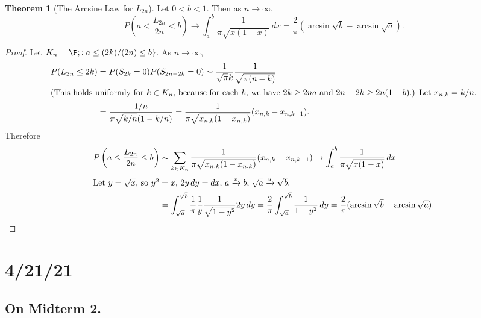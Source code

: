 \documentclass{article}
\theoremstyle{definition}
\newtheorem{theorem}{Theorem}
\begin{document}
\begin{theorem}[The Arcsine Law for $L_{2n}$]
 Let $0 < b < 1$. Then as $n \to \infty$,
 \[
    P\left(a < \frac{L_{2n}}{2n} < b\right) \to \int_a^b \frac{1}{\pi\sqrt{x(1-x)}} \,dx = \frac{2}{\pi}(\operatorname{arcsin}\sqrt{b} - \operatorname{arcsin}\sqrt{a}).
 \]    
\end{theorem}
\begin{proof}
    Let $K_n = \P; : a \leq (2k)/(2n) \leq b\}$. As $n \to \infty$,
    \begin{align*}
        P(L_{2n} \leq 2k) &= P(S_{2k} = 0)P(S_{2n-2k} = 0) \sim \frac{1}{\sqrt{\pi}k}\frac{1}{\sqrt{\pi(n-k)}} \\
        \intertext{(This holds uniformly for $k \in K_n$, because for each $k$, we have $2k \geq 2na$ and $2n - 2k \geq 2n(1-b)$.) Let $x_{n,k} = k/n$.}
        &= \frac{1/n}{\pi\sqrt{k/n}(1-k/n)} = \frac{1}{\pi\sqrt{x_{n,k}(1-x_{n,k})}}(x_{n,k} - x_{n,k-1}).
    \end{align*}
    Therefore
    \begin{align*}
        P\left(a \leq \frac{L_{2n}}{2n} \leq b\right) &\sim \sum_{k \in K_n} \frac{1}{\pi\sqrt{x_{n,k}(1-x_{n,k})}} (x_{n,k} - x_{n,k-1}) \to \int_a^b \frac{1}{\pi\sqrt{x(1-x)}} \,dx \\
        \intertext{Let $y = \sqrt{x}$, so $y^2 = x$, $2y\,dy = dx$; $a \xrightarrow{x} b$, $\sqrt{a} \xrightarrow{y} \sqrt{b}$.}
        &= \int_{\sqrt{a}}^{\sqrt{b}} \frac{1}{\pi}\frac{1}{y} \frac{1}{\sqrt{1-y^2}}2y\,dy = \frac{2}{\pi} \int_{\sqrt{a}}^{\sqrt{b}} \frac{1}{1-y^2} \,dy = \frac{2}{\pi}(\operatorname{arcsin}\sqrt{b} - \operatorname{arcsin}\sqrt{a}).
    \end{align*}
\end{proof}

\section{4/21/21}
\subsection*{On Midterm 2.}
\end{document}
